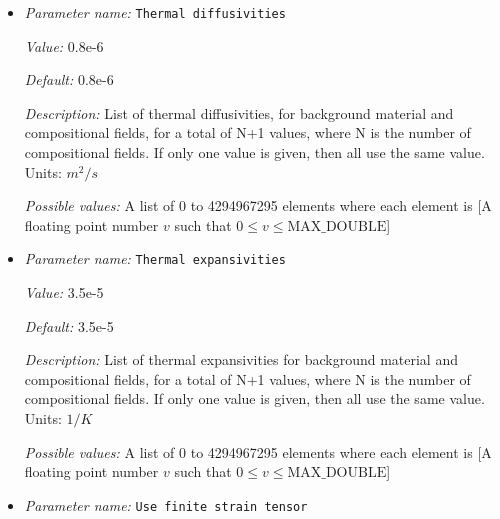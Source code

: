 \begin{itemize}
{\it Value:} 1.0


{\it Default:} 1.0


{\it Description:} List of stress limiter exponents, $n_{\text{lim}}$, for background material and compositional fields, for a total of N+1 values, where N is the number of compositional fields. Units: none.


{\it Possible values:} A list of 0 to 4294967295 elements where each element is [A floating point number $v$ such that $0 \leq v \leq \text{MAX\_DOUBLE}$]
\item {\it Parameter name:} {\tt Thermal diffusivities}
\label{parameters:Material model/Visco Plastic/Thermal diffusivities}


{\it Value:} 0.8e-6


{\it Default:} 0.8e-6


{\it Description:} List of thermal diffusivities, for background material and compositional fields, for a total of N+1 values, where N is the number of compositional fields. If only one value is given, then all use the same value.  Units: $m^2/s$


{\it Possible values:} A list of 0 to 4294967295 elements where each element is [A floating point number $v$ such that $0 \leq v \leq \text{MAX\_DOUBLE}$]
\item {\it Parameter name:} {\tt Thermal expansivities}
\label{parameters:Material model/Visco Plastic/Thermal expansivities}


{\it Value:} 3.5e-5


{\it Default:} 3.5e-5


{\it Description:} List of thermal expansivities for background material and compositional fields, for a total of N+1 values, where N is the number of compositional fields. If only one value is given, then all use the same value.  Units: $1 / K$


{\it Possible values:} A list of 0 to 4294967295 elements where each element is [A floating point number $v$ such that $0 \leq v \leq \text{MAX\_DOUBLE}$]
\item {\it Parameter name:} {\tt Use finite strain tensor}
\label{parameters:Material model/Visco Plastic/Use finite strain tensor}



\end{itemize}
